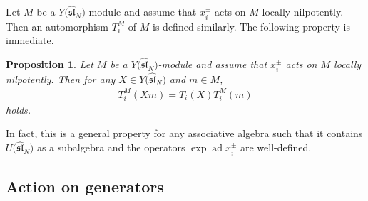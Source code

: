 \documentclass[11pt]{article}
\newtheorem{prop}[thm]{Proposition}
\theoremstyle{definition}
\numberwithin{equation}{section}
\DeclareMathOperator{\ad}{ad}
\newcommand{\affY}{Y\big(\affsl\big)}
\newcommand{\affsl}{\hat{\mathfrak{sl}}_N}
\begin{document}
Let $M$ be a $\affY$-module and assume that $x_i^{\pm}$ acts on $M$ locally nilpotently. Then an automorphism $T_i^M$ of $M$ is defined similarly. The following property is immediate.
\begin{prop}Let $M$ be a $\affY$-module and assume that $x_i^{\pm}$ acts on $M$ locally nilpotently. Then for any $X \in \affY$ and $m \in M$,
\begin{gather*}
T_i^M(Xm)=T_i(X)T_i^M(m)
\end{gather*}
holds.
\end{prop}

In fact, this is a general property for any associative algebra such that it contains $U\big(\affsl\big)$ as a subalgebra and the operators $\exp\ad x_i^{\pm}$ are well-defined.

\subsection{Action on generators}
\end{document}
